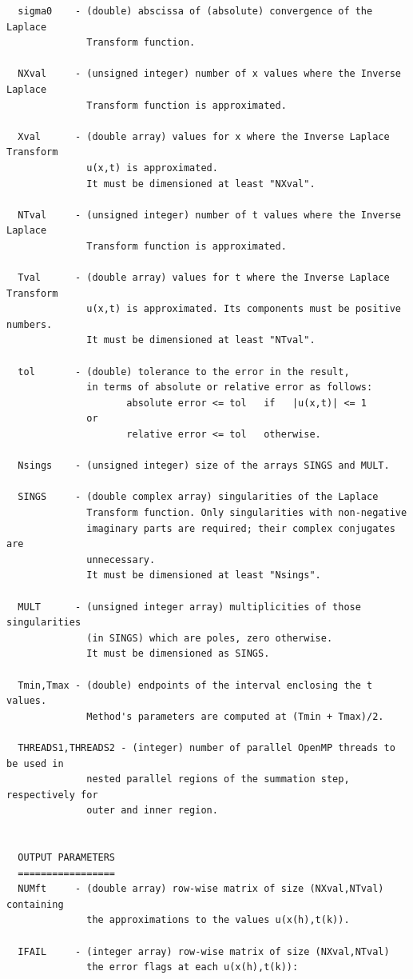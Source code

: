 \documentclass[a4paper,10pt]{report}%
\begin{document}
\begin{lstlisting}
  sigma0    - (double) abscissa of (absolute) convergence of the Laplace
              Transform function.

  NXval     - (unsigned integer) number of x values where the Inverse Laplace
              Transform function is approximated.

  Xval      - (double array) values for x where the Inverse Laplace Transform
              u(x,t) is approximated.
              It must be dimensioned at least "NXval".

  NTval     - (unsigned integer) number of t values where the Inverse Laplace
              Transform function is approximated.

  Tval      - (double array) values for t where the Inverse Laplace Transform
              u(x,t) is approximated. Its components must be positive numbers.
              It must be dimensioned at least "NTval".

  tol       - (double) tolerance to the error in the result,
              in terms of absolute or relative error as follows:
                     absolute error <= tol   if   |u(x,t)| <= 1
              or
                     relative error <= tol   otherwise.

  Nsings    - (unsigned integer) size of the arrays SINGS and MULT.

  SINGS     - (double complex array) singularities of the Laplace
              Transform function. Only singularities with non-negative
              imaginary parts are required; their complex conjugates are
              unnecessary.
              It must be dimensioned at least "Nsings".

  MULT      - (unsigned integer array) multiplicities of those singularities
              (in SINGS) which are poles, zero otherwise.
              It must be dimensioned as SINGS.

  Tmin,Tmax - (double) endpoints of the interval enclosing the t values.
              Method's parameters are computed at (Tmin + Tmax)/2.

  THREADS1,THREADS2 - (integer) number of parallel OpenMP threads to be used in
              nested parallel regions of the summation step, respectively for
              outer and inner region.


  OUTPUT PARAMETERS
  =================
  NUMft     - (double array) row-wise matrix of size (NXval,NTval) containing
              the approximations to the values u(x(h),t(k)).

  IFAIL     - (integer array) row-wise matrix of size (NXval,NTval)
              the error flags at each u(x(h),t(k)):


\end{lstlisting}
\end{document}
